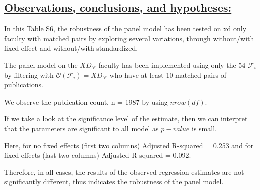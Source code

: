 \documentclass{article}\usepackage[]{graphicx}\usepackage[]{color}
\begin{document}
\subsection*{\underline{Observations, conclusions, and hypotheses:}}
\begin{description}
  \item
  \item In this Table S6, the robustness of the panel model has been tested on xd only faculty with matched pairs by exploring several variations, through without/with fixed effect and without/with standardized.
  \item[$\bullet$] The panel model on the $XD_\mathcal{F}$ faculty has been implemented using only the 54 $\mathcal{F}_i$ by filtering with $\mathscr{O}(\mathcal{F}_i) = XD_\mathcal{F}$
  who have at least 10 matched pairs of publications.
  \item[$\bullet$] We observe the publication count, n = 1987 by using $nrow(df)$.
  \item[$\bullet$] If we take a look at the significance level of the estimate, then we can interpret that the parameters are significant to all model as $p-value$ is small. 
    \item[$\bullet$] Here, for no fixed effects (first two columns) Adjusted R-squared = 0.253 and for fixed effects (last two columns) Adjusted R-squared = 0.092.
  \item Therefore, in all cases, the results of the observed regression estimates are not significantly different, thus indicates the robustness of the panel model.
\end{description}
\end{document}
